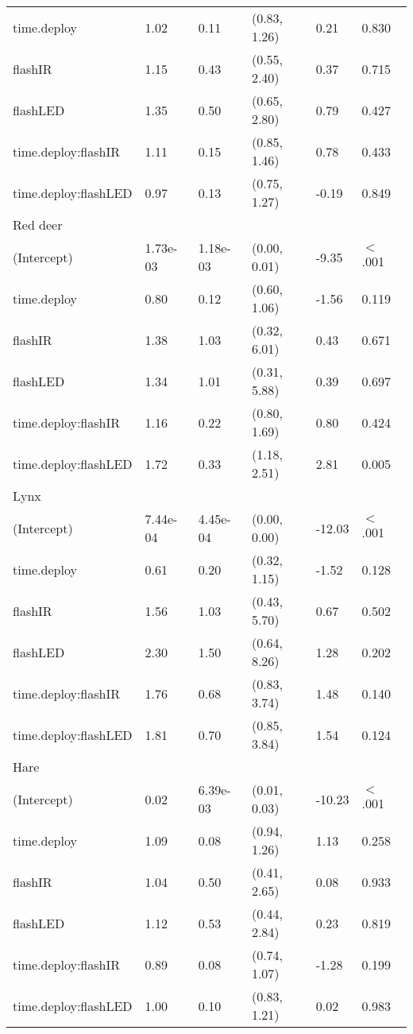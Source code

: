 \begin{table}[ht]
\begin{tabular}{llllll}
  time.deploy & 1.02 & 0.11 & (0.83, 1.26) & 0.21 & 0.830  \\ 
  flashIR & 1.15 & 0.43 & (0.55, 2.40) & 0.37 & 0.715  \\ 
  flashLED & 1.35 & 0.50 & (0.65, 2.80) & 0.79 & 0.427  \\ 
  time.deploy:flashIR & 1.11 & 0.15 & (0.85, 1.46) & 0.78 & 0.433  \\ 
  time.deploy:flashLED & 0.97 & 0.13 & (0.75, 1.27) & -0.19 & 0.849  \\ 
  Red deer &  &  &  &  &        \\ 
  (Intercept) & 1.73e-03 & 1.18e-03 & (0.00, 0.01) & -9.35 & $<$ .001 \\ 
  time.deploy & 0.80 & 0.12 & (0.60, 1.06) & -1.56 & 0.119  \\ 
  flashIR & 1.38 & 1.03 & (0.32, 6.01) & 0.43 & 0.671  \\ 
  flashLED & 1.34 & 1.01 & (0.31, 5.88) & 0.39 & 0.697  \\ 
  time.deploy:flashIR & 1.16 & 0.22 & (0.80, 1.69) & 0.80 & 0.424  \\ 
  time.deploy:flashLED & 1.72 & 0.33 & (1.18, 2.51) & 2.81 & 0.005  \\ 
  Lynx &  &  &  &  &        \\ 
  (Intercept) & 7.44e-04 & 4.45e-04 & (0.00, 0.00) & -12.03 & $<$ .001 \\ 
  time.deploy & 0.61 & 0.20 & (0.32, 1.15) & -1.52 & 0.128  \\ 
  flashIR & 1.56 & 1.03 & (0.43, 5.70) & 0.67 & 0.502  \\ 
  flashLED & 2.30 & 1.50 & (0.64, 8.26) & 1.28 & 0.202  \\ 
  time.deploy:flashIR & 1.76 & 0.68 & (0.83, 3.74) & 1.48 & 0.140  \\ 
  time.deploy:flashLED & 1.81 & 0.70 & (0.85, 3.84) & 1.54 & 0.124  \\ 
  Hare &  &  &  &  &        \\ 
  (Intercept) & 0.02 & 6.39e-03 & (0.01, 0.03) & -10.23 & $<$ .001 \\ 
  time.deploy & 1.09 & 0.08 & (0.94, 1.26) & 1.13 & 0.258  \\ 
  flashIR & 1.04 & 0.50 & (0.41, 2.65) & 0.08 & 0.933  \\ 
  flashLED & 1.12 & 0.53 & (0.44, 2.84) & 0.23 & 0.819  \\ 
  time.deploy:flashIR & 0.89 & 0.08 & (0.74, 1.07) & -1.28 & 0.199  \\ 
  time.deploy:flashLED & 1.00 & 0.10 & (0.83, 1.21) & 0.02 & 0.983  \\ 

\end{tabular}
\end{table}
